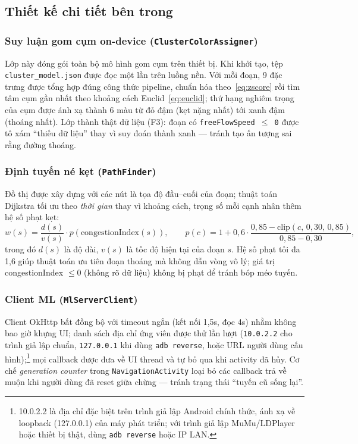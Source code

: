 \subsection{Thiết kế chi tiết bên trong}

\subsubsection{Suy luận gom cụm on-device (\texttt{ClusterColorAssigner})}
Lớp này đóng gói toàn bộ mô hình gom cụm trên thiết bị. Khi khởi tạo, tệp \texttt{cluster\_model.json} được đọc một lần trên luồng nền. Với mỗi đoạn, 9 đặc trưng được tổng hợp đúng công thức pipeline, chuẩn hóa theo~\eqref{eq:zscore} rồi tìm tâm cụm gần nhất theo khoảng cách Euclid~\eqref{eq:euclid}; thứ hạng nghiêm trọng của cụm được ánh xạ thành 6 màu từ đỏ đậm (kẹt nặng nhất) tới xanh đậm (thoáng nhất). Lớp thành thật dữ liệu (F3): đoạn có \texttt{freeFlowSpeed $\le$ 0} được tô xám ``thiếu dữ liệu'' thay vì suy đoán thành xanh --- tránh tạo ấn tượng sai rằng đường thoáng.

\subsubsection{Định tuyến né kẹt (\texttt{PathFinder})}
Đồ thị được xây dựng với các nút là tọa độ đầu--cuối của đoạn; thuật toán Dijkstra tối ưu theo \textit{thời gian} thay vì khoảng cách, trọng số mỗi cạnh nhân thêm hệ số phạt kẹt:
\begin{equation}
w(s) = \frac{d(s)}{v(s)} \cdot p\!\left(\text{congestionIndex}(s)\right), \qquad p(c) = 1 + 0{,}6 \cdot \frac{0{,}85 - \mathrm{clip}(c,\,0{,}30,\,0{,}85)}{0{,}85 - 0{,}30},
\label{eq:penalty}
\end{equation}
trong đó $d(s)$ là độ dài, $v(s)$ là tốc độ hiện tại của đoạn $s$. Hệ số phạt tối đa 1,6 giúp thuật toán ưu tiên đoạn thoáng mà không dẫn vòng vô lý; giá trị congestionIndex $\le 0$ (không rõ dữ liệu) không bị phạt để tránh bóp méo tuyến.

\subsubsection{Client ML (\texttt{MlServerClient})}
Client OkHttp bất đồng bộ với timeout ngắn (kết nối 1,5s, đọc 4s) nhằm không bao giờ khựng UI; danh sách địa chỉ ứng viên được thử lần lượt (\texttt{10.0.2.2} cho trình giả lập chuẩn, \texttt{127.0.0.1} khi dùng \texttt{adb reverse}, hoặc URL người dùng cấu hình);\footnote{10.0.2.2 là địa chỉ đặc biệt trên trình giả lập Android chính thức, ánh xạ về loopback (127.0.0.1) của máy phát triển; với trình giả lập MuMu/LDPlayer hoặc thiết bị thật, dùng \texttt{adb reverse} hoặc IP LAN.} mọi callback được đưa về UI thread và tự bỏ qua khi activity đã hủy. Cơ chế \textit{generation counter} trong \texttt{NavigationActivity} loại bỏ các callback trả về muộn khi người dùng đã reset giữa chừng --- tránh trạng thái ``tuyến cũ sống lại''.

